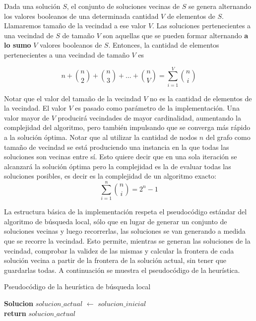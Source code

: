 \par{Dada una solución $S$, el conjunto de soluciones vecinas de $S$ se genera
alternando los valores booleanos de una determinada cantidad $V$ de elementos
de $S$. Llamaremos tamaño de la vecindad a ese valor $V$. Las soluciones
pertenecientes a una vecindad de $S$ de tamaño $V$ son aquellas que se pueden
formar alternando \textbf{a lo sumo} $V$ valores booleanos de $S$. Entonces,
la cantidad de elementos pertenecientes a una vecindad de tamaño $V$ es}

\[
n + \binom{n}{2} + \binom{n}{3} + \dots + \binom{n}{V} = \sum_{i=1}^{V} \binom{n}{i}
\]

\par{Notar que el valor del tamaño de la vecindad $V$ no es la cantidad de
elementos de la vecindad. El valor $V$ es pasado como parámetro de la
implementación. Una valor mayor de $V$ producirá vecindades de mayor
cardinalidad, aumentando la complejidad del algoritmo, pero también
impulsando que se converga más rápido a la solución óptima. Notar que
al utilizar la cantidad de nodos $n$ del grafo como tamaño de vecindad
se está produciendo una instancia en la que todas las soluciones son vecinas
entre sí. Esto quiere decir que en una sola iteración se alcanzará la
solución óptima pero la complejidad es la de evaluar todas las soluciones
posibles, es decir es la complejidad de un algoritmo exacto:}
\[
\sum_{i=1}^{n} \binom{n}{i} = 2^n -1
\]
\par{La estructura básica de la implementación respeta el pseudocódigo estándar
del algoritmo de búsqueda local, sólo que en lugar de generar un conjunto de
soluciones vecinas y luego recorrerlas, las soluciones se van generando a
medida que se recorre la vecindad. Esto permite, mientras se generan las
soluciones de la vecindad, comprobar la validez de las mismas y calcular
la frontera de cada solución vecina a partir de la frontera de la solución
actual, sin tener que guardarlas todas. A continuación se muestra el
pseudocódigo de la heurística.}\\

\begin{algorithm}[H]
	\caption{Pseudocódigo de la heurística de búsqueda local}
	\textbf{Solucion} $solucion\_actual$ $\leftarrow$ $solucion\_inicial$\\
	\textbf{return} $solucion\_actual$
\end{algorithm}

